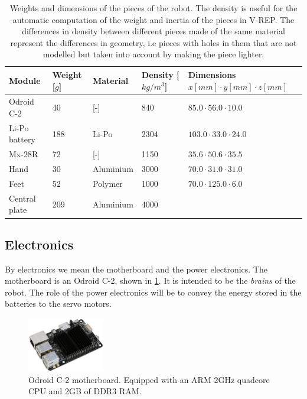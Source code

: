 \begin{table}[htp]
\center
\begin{tabularx}{\textwidth}{@{} l l X X p{4.1cm} @{}}
\toprule
\textbf{Module} & \textbf{Weight [$g$]} & \textbf{Material} &  \textbf{Density [$kg/m^3$]}& \textbf{Dimensions $x[mm] \cdot y[mm] \cdot z[mm]$}\\ 
\midrule
Odroid C-2 & 40 & [-] & 840 & $85.0 \cdot 56.0 \cdot 10.0$\\
Li-Po battery & 188 & Li-Po & 2304 & $103.0 \cdot 33.0 \cdot 24.0$\\
Mx-28R & 72 & [-] & 1150 & $35.6 \cdot 50.6 \cdot 35.5$\\
Hand & 30 & Aluminium & 3000 & $70.0 \cdot 31.0 \cdot 31.0$\\
Feet & 52 & Polymer & 1000 & $70.0 \cdot 125.0 \cdot 6.0$\\
Central plate & 209 & Aluminium & 4000 & \\
\bottomrule
\end{tabularx}
\caption[Weights and dimensions of the pieces of the robot]{Weights and dimensions of the pieces of the robot. The density is useful for the automatic computation of the weight and inertia of the pieces in V-REP. The differences in density between different pieces made of the same material represent the differences in geometry, i.e pieces with holes in them that are not modelled but taken into account by making the piece lighter.}
\label{table:weights}
\end{table}

\subsection{Electronics}
By electronics we mean the motherboard and the power electronics. The motherboard is an Odroid C-2, shown in \cref{fig:electronics}. It is intended to be the \emph{brains} of the robot. The role of the power electronics will be to convey the energy stored in the batteries to the servo motors. 

\begin{figure}[htp]
\center
\includegraphics[width=0.3\textwidth]{figures/odroid-c2}
\caption[Odroid C-2]{Odroid C-2 motherboard. Equipped with an ARM 2GHz quadcore CPU and 2GB of DDR3 RAM.}
\label{fig:electronics}
\end{figure}

